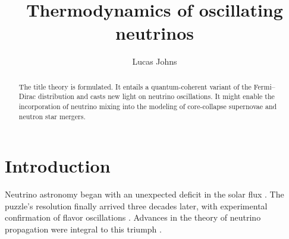 \documentclass[aps,prd,twocolumn,groupedaddress,preprintnumbers]{revtex4-2}
\begin{document}

\title{Thermodynamics of oscillating neutrinos}


\author{Lucas Johns}



\begin{abstract}
The title theory is formulated. It entails a quantum-coherent variant of the Fermi--Dirac distribution and casts new light on neutrino oscillations. It might enable the incorporation of neutrino mixing into the modeling of core-collapse supernovae and neutron star mergers.
\end{abstract}



\maketitle







\section{Introduction}

Neutrino astronomy began with an unexpected deficit in the solar flux \cite{bahcall1976}. The puzzle's resolution finally arrived three decades later, with experimental confirmation of flavor oscillations \cite{davis2003, koshiba2003, kajita2016, mcdonald2016}. Advances in the theory of neutrino propagation were integral to this triumph \cite{gribov1969, nussinov1976, wolfenstein1978, mikheyev1985, bethe1986, haxton1986, parke1986, kuo1989}.
\end{document}

